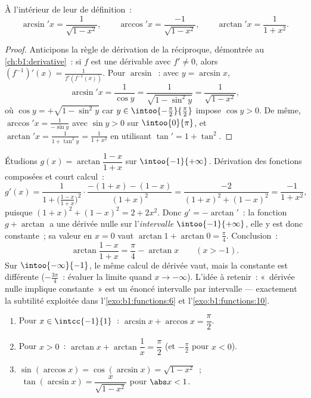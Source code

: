\begin{proposition}[Dérivées]\label{prop:b1:functions:arcderiv}
À l'intérieur de leur  de définition~:
\[
\arcsin' x = \frac{1}{\sqrt{1 - x^2}},
\qquad
\arccos' x = \frac{-1}{\sqrt{1 - x^2}},
\qquad
\arctan' x = \frac{1}{1 + x^2}.
\]
\end{proposition}

\begin{proof}
Anticipons la règle de dérivation de la réciproque, démontrée au
\cref{ch:b1:derivative}~: si $f$ est une  dérivable avec
$f' \neq 0$, alors $(f^{-1})'(x) = \frac{1}{f'(f^{-1}(x))}$. Pour
$\arcsin$~: avec $y = \arcsin x$,
\[
\arcsin' x = \frac{1}{\cos y}
= \frac{1}{\sqrt{1 - \sin^2 y}} = \frac{1}{\sqrt{1 - x^2}},
\]
où $\cos y = +\sqrt{1 - \sin^2 y}$ car $y \in
\intoo{-\frac\pi2}{\frac\pi2}$ impose $\cos y > 0$. De même,
$\arccos' x = \frac{1}{-\sin y}$ avec $\sin y > 0$ sur
$\intoo{0}{\pi}$, et $\arctan' x = \frac{1}{1 + \tan^2 y} =
\frac{1}{1 + x^2}$ en utilisant $\tan' = 1 + \tan^2$.
\end{proof}

\begin{example}\label{ex:b1:functions:hiddenconst}
Étudions $g(x) = \arctan\dfrac{1 - x}{1 + x}$ sur $\intoo{-1}
{+\infty}$. Dérivation des fonctions composées et court calcul~:
\[
g'(x) = \frac{1}{1 + \bigl(\frac{1-x}{1+x}\bigr)^2}\cdot
\frac{-(1+x) - (1-x)}{(1+x)^2}
= \frac{-2}{(1+x)^2 + (1-x)^2}
= \frac{-1}{1 + x^2} ,
\]
puisque $(1+x)^2 + (1-x)^2 = 2 + 2x^2$. Donc $g' = -\arctan'$~: la
fonction $g + \arctan$ a une dérivée nulle sur l'\emph{intervalle}
$\intoo{-1}{+\infty}$, elle y est donc constante~; sa valeur en $x =
0$ vaut $\arctan 1 + \arctan 0 = \frac\pi4$. Conclusion~:
\[
\arctan\frac{1 - x}{1 + x} = \frac\pi4 - \arctan x
\qquad (x > -1) .
\]
Sur $\intoo{-\infty}{-1}$, le même calcul de dérivée vaut, mais la
constante est différente ($-\frac{3\pi}4$~: évaluer la limite quand
$x \to -\infty$). L'idée à retenir~: «~dérivée nulle implique
constante~» est un énoncé intervalle par intervalle --- exactement la
subtilité exploitée dans l'\cref{exo:b1:functions:6} et
l'\cref{exo:b1:functions:10}.
\end{example}

\begin{proposition}\label{prop:b1:functions:arcidentities}
\begin{enumerate}
  \item Pour $x \in \intcc{-1}{1}$~: $\arcsin x + \arccos x =
        \dfrac{\pi}{2}$.
  \item Pour $x > 0$~: $\arctan x + \arctan\dfrac 1x = \dfrac{\pi}{2}$
        (et $-\frac\pi2$ pour $x < 0$).
  \item $\sin(\arccos x) = \cos(\arcsin x) = \sqrt{1 - x^2}$~;
        $\;\tan(\arcsin x) = \dfrac{x}{\sqrt{1 - x^2}}$ pour
        $\abs x < 1$.
\end{enumerate}
\end{proposition}

